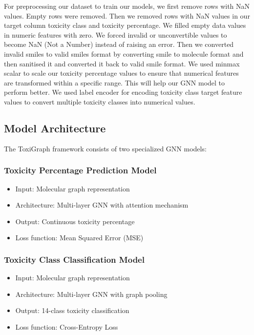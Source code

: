 \documentclass[conference]{IEEEtran}
\begin{document}
For preprocessing our dataset to train our models, we first remove rows with NaN values. Empty rows were removed. Then we removed rows with NaN values in our target column toxicity class and toxicity percentage.
\break\break
We filled empty data values in numeric features with zero. We forced invalid or unconvertible values to become NaN (Not a Number) instead of raising an error.
\break\break
Then we converted invalid smiles to valid smiles format by converting smile to molecule format and then sanitised it and converted it back to valid smile format. 
\break\break
We used minmax scalar to scale our toxicity percentage values to ensure that numerical features are transformed within a specific range. This will help our GNN model to perform better. We used label encoder for encoding toxicity class target feature values to convert multiple toxicity classes into numerical values.

\subsection{Model Architecture}
The ToxiGraph framework consists of two specialized GNN models:

\subsubsection{Toxicity Percentage Prediction Model}
\begin{itemize}
    \item Input: Molecular graph representation
    \item Architecture: Multi-layer GNN with attention mechanism
    \item Output: Continuous toxicity percentage
    \item Loss function: Mean Squared Error (MSE)
\end{itemize}

\subsubsection{Toxicity Class Classification Model}
\begin{itemize}
    \item Input: Molecular graph representation
    \item Architecture: Multi-layer GNN with graph pooling
    \item Output: 14-class toxicity classification
    \item Loss function: Cross-Entropy Loss
\end{itemize}
\end{document}
